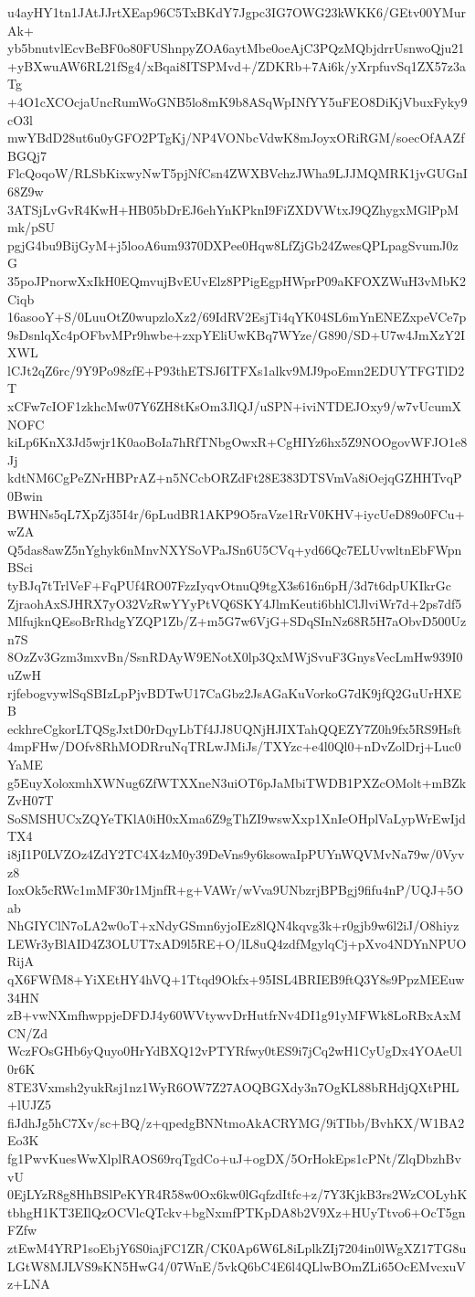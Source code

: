 u4ayHY1tn1JAtJJrtXEap96C5TxBKdY7Jgpc3IG7OWG23kWKK6/GEtv00YMurAk+
yb5bnutvlEcvBeBF0o80FUShnpyZOA6aytMbe0oeAjC3PQzMQbjdrrUsnwoQju21
+yBXwuAW6RL21fSg4/xBqai8ITSPMvd+/ZDKRb+7Ai6k/yXrpfuvSq1ZX57z3aTg
+4O1cXCOcjaUncRumWoGNB5lo8mK9b8ASqWpINfYY5uFEO8DiKjVbuxFyky9cO3l
mwYBdD28ut6u0yGFO2PTgKj/NP4VONbcVdwK8mJoyxORiRGM/soecOfAAZfBGQj7
FlcQoqoW/RLSbKixwyNwT5pjNfCsn4ZWXBVchzJWha9LJJMQMRK1jvGUGnI68Z9w
3ATSjLvGvR4KwH+HB05bDrEJ6ehYnKPknI9FiZXDVWtxJ9QZhygxMGlPpMmk/pSU
pgjG4bu9BijGyM+j5looA6um9370DXPee0Hqw8LfZjGb24ZwesQPLpagSvumJ0zG
35poJPnorwXxIkH0EQmvujBvEUvElz8PPigEgpHWprP09aKFOXZWuH3vMbK2Ciqb
16asooY+S/0LuuOtZ0wupzloXz2/69IdRV2EsjTi4qYK04SL6mYnENEZxpeVCe7p
9sDsnlqXc4pOFbvMPr9hwbe+zxpYEliUwKBq7WYze/G890/SD+U7w4JmXzY2IXWL
lCJt2qZ6rc/9Y9Po98zfE+P93thETSJ6ITFXs1alkv9MJ9poEmn2EDUYTFGTlD2T
xCFw7cIOF1zkhcMw07Y6ZH8tKsOm3JlQJ/uSPN+iviNTDEJOxy9/w7vUcumXNOFC
kiLp6KnX3Jd5wjr1K0aoBoIa7hRfTNbgOwxR+CgHIYz6hx5Z9NOOgovWFJO1e8Jj
kdtNM6CgPeZNrHBPrAZ+n5NCcbORZdFt28E383DTSVmVa8iOejqGZHHTvqP0Bwin
BWHNs5qL7XpZj35I4r/6pLudBR1AKP9O5raVze1RrV0KHV+iycUeD89o0FCu+wZA
Q5das8awZ5nYghyk6nMnvNXYSoVPaJSn6U5CVq+yd66Qc7ELUvwltnEbFWpnBSci
tyBJq7tTrlVeF+FqPUf4RO07FzzIyqvOtnuQ9tgX3s616n6pH/3d7t6dpUKIkrGc
ZjraohAxSJHRX7yO32VzRwYYyPtVQ6SKY4JlmKeuti6bhlClJlviWr7d+2ps7df5
MlfujknQEsoBrRhdgYZQP1Zb/Z+m5G7w6VjG+SDqSInNz68R5H7aObvD500Uzn7S
8OzZv3Gzm3mxvBn/SsnRDAyW9ENotX0lp3QxMWjSvuF3GnysVecLmHw939I0uZwH
rjfebogvywlSqSBIzLpPjvBDTwU17CaGbz2JsAGaKuVorkoG7dK9jfQ2GuUrHXEB
eckhreCgkorLTQSgJxtD0rDqyLbTf4JJ8UQNjHJIXTahQQEZY7Z0h9fx5RS9Hsft
4mpFHw/DOfv8RhMODRruNqTRLwJMiJs/TXYzc+e4l0Ql0+nDvZolDrj+Luc0YaME
g5EuyXoloxmhXWNug6ZfWTXXneN3uiOT6pJaMbiTWDB1PXZcOMolt+mBZkZvH07T
SoSMSHUCxZQYeTKlA0iH0xXma6Z9gThZI9wswXxp1XnIeOHplVaLypWrEwIjdTX4
i8jI1P0LVZOz4ZdY2TC4X4zM0y39DeVns9y6ksowaIpPUYnWQVMvNa79w/0Vyvz8
IoxOk5cRWc1mMF30r1MjnfR+g+VAWr/wVva9UNbzrjBPBgj9fifu4nP/UQJ+5Oab
NhGIYClN7oLA2w0oT+xNdyGSmn6yjoIEz8lQN4kqvg3k+r0gjb9w6l2iJ/O8hiyz
LEWr3yBlAID4Z3OLUT7xAD9l5RE+O/lL8uQ4zdfMgylqCj+pXvo4NDYnNPUORijA
qX6FWfM8+YiXEtHY4hVQ+1Ttqd9Okfx+95ISL4BRIEB9ftQ3Y8s9PpzMEEuw34HN
zB+vwNXmfhwppjeDFDJ4y60WVtywvDrHutfrNv4DI1g91yMFWk8LoRBxAxMCN/Zd
WczFOsGHb6yQuyo0HrYdBXQ12vPTYRfwy0tES9i7jCq2wH1CyUgDx4YOAeUl0r6K
8TE3Vxmsh2yukRsj1nz1WyR6OW7Z27AOQBGXdy3n7OgKL88bRHdjQXtPHL+lUJZ5
fiJdhJg5hC7Xv/sc+BQ/z+qpedgBNNtmoAkACRYMG/9iTIbb/BvhKX/W1BA2Eo3K
fg1PwvKuesWwXlplRAOS69rqTgdCo+uJ+ogDX/5OrHokEps1cPNt/ZlqDbzhBvvU
0EjLYzR8g8HhBSlPeKYR4R58w0Ox6kw0lGqfzdItfc+z/7Y3KjkB3rs2WzCOLyhK
tbhgH1KT3EIlQzOCVlcQTckv+bgNxmfPTKpDA8b2V9Xz+HUyTtvo6+OcT5gnFZfw
ztEwM4YRP1soEbjY6S0iajFC1ZR/CK0Ap6W6L8iLplkZIj7204in0lWgXZ17TG8u
LGtW8MJLVS9sKN5HwG4/07WnE/5vkQ6bC4E6l4QLlwBOmZLi65OcEMvcxuVz+LNA
